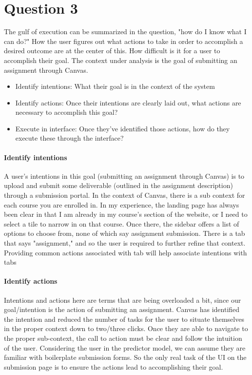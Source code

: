\section{Question 3}

The gulf of execution can be summarized in the question, "how do I know what I can do?" How the user figures out what actions to take in order to accomplish a desired outcome are at the center of this. How difficult is it for a user to accomplish their goal. The context under analysis is the goal of submitting an assignment through Canvas.

\begin{itemize}
\item
Identify intentions: What their goal is in the context of the system
\item
Identify actions: Once their intentions are clearly laid out, what actions are necessary to accomplish this goal?
\item
Execute in interface: Once they've identified those actions, how do they execute these through the interface?
\end{itemize}

\paragraph{Identify intentions}
A user's intentions in this goal (submitting an assignment through Canvas) is to upload and submit some deliverable (outlined in the assignment description) through a submission portal. In the context of Canvas, there is a sub context for each course you are enrolled in. In my experience, the landing page has always been clear in that I am already in my course's section of the website, or I need to select a tile to narrow in on that course. Once there, the sidebar offers a list of options to choose from, none of which say assignment submission. There is a tab that says "assignment," and so the user is required to further refine that context. Providing common actions associated with tab will help associate intentions with tabs

\paragraph{Identify actions}
Intentions and actions here are terms that are being overloaded a bit, since our goal/intention is the action of submitting an assignment. Canvas has identified the intention and reduced the number of tasks for the user to situate themselves in the proper context down to two/three clicks. Once they are able to navigate to the proper sub-context, the call to action must be clear and follow the intuition of the user. Considering the user in the predictor model, we can assume they are familiar with boilerplate submission forms. So the only real task of the UI on the submission page is to ensure the actions lead to accomplishing their goal.

